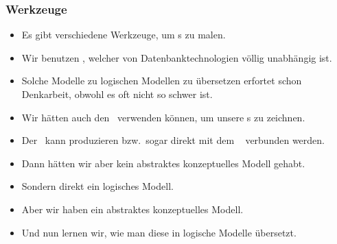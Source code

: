 \documentclass[aspectratio=169,mathserif,notheorems]{beamer}%
\begin{document}
\begin{frame}%
\frametitle{Werkzeuge}%
\begin{itemize}%
\item Es gibt verschiedene Werkzeuge, um s zu malen.%
%
\item<2-> Wir benutzen \yEd, welcher von Datenbanktechnologien völlig unabhängig ist.%
%
\item<3-> Solche Modelle zu logischen Modellen zu übersetzen erfortet schon Denkarbeit, obwohl es oft nicht so schwer ist.%
%
\item<4-> Wir hätten auch den \pgmodeler\ verwenden können, um unsere s zu zeichnen.%
%
\item<5-> Der \pgmodeler\ kann  produzieren bzw.\ sogar direkt mit dem \postgresql\  verbunden werden.%
%
\item<6-> Dann hätten wir aber kein abstraktes konzeptuelles Modell gehabt.%
%
\item<7-> Sondern direkt ein logisches Modell.%
%
\item<8-> Aber wir haben ein abstraktes konzeptuelles Modell.%
%
\item<9-> Und nun lernen wir, wie man diese in logische Modelle übersetzt.%
\end{itemize}%
\end{frame}%
%
\end{document}
